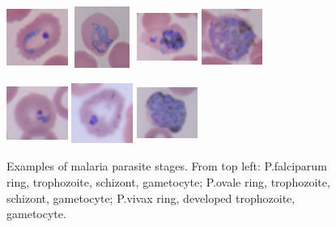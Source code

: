 {\begin{figure}[!b]
		\includegraphics[width=2cm, height=2cm]{images/malaria/ovale_1_ring}
		\includegraphics[width=2cm, height=2cm]{images/malaria/ovale_2_trophozoite}
		\includegraphics[width=2cm, height=2cm]{images/malaria/ovale_3_schizont}
		\includegraphics[width=2cm, height=2cm]{images/malaria/ovale_4_gametocyte}
		
		\includegraphics[width=2cm, height=2cm]{images/malaria/vivax_1_ring}
		\includegraphics[width=2cm, height=2cm]{images/malaria/vivax_2c_trophozoiteDeveloped}
		\includegraphics[width=2cm, height=2cm]{images/malaria/vivax_4_gametocyte}
		\caption[Malaria parasite stages.]{\label{fig6_malaria_stages}Examples of malaria parasite stages. From top left: P.falciparum ring, trophozoite, schizont, gametocyte;
			P.ovale ring, trophozoite, schizont, gametocyte; P.vivax ring, developed trophozoite, gametocyte. \cite{Loddo2018}}
	\end{figure}
	
}
